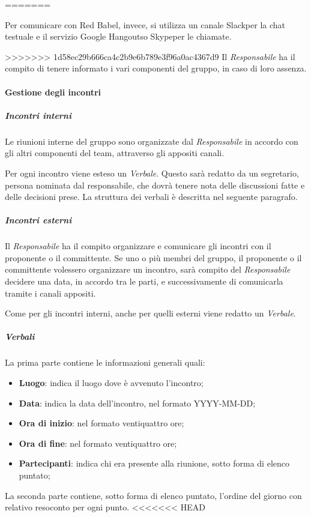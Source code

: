 =======

   					Per comunicare con Red Babel, invece, si utilizza un canale Slack\glo per la chat testuale e il servizio Google Hangouts\glos o Skype\glo per le chiamate.

>>>>>>> 1d58ec29b666ca4c2b9e6b789e3f96a0ac4367d9
   					Il \textit{Responsabile} ha il compito di tenere informato i vari componenti del gruppo, in caso di loro assenza.
   			\paragraph{Gestione degli incontri}
   				\subparagraph{Incontri interni}
   					Le riunioni interne del gruppo sono organizzate dal \textit{Responsabile} in accordo con gli altri componenti del team, attraverso gli appositi canali.

   					Per ogni incontro viene esteso un \textit{Verbale}. Questo sarà redatto da un segretario, persona nominata dal responsabile, che dovrà tenere nota delle discussioni fatte e delle decisioni prese. La struttura dei verbali è descritta nel seguente paragrafo.
	   			\subparagraph{Incontri esterni}
   					Il \textit{Responsabile} ha il compito organizzare e comunicare gli incontri con il proponente o il committente. Se uno o più membri del gruppo, il proponente o il committente volessero organizzare un incontro, sarà compito del \textit{Responsabile} decidere una data, in accordo tra le parti, e successivamente di comunicarla tramite i canali appositi.

   					Come per gli incontri interni, anche per quelli esterni viene redatto un \textit{Verbale}.
   				\subparagraph{Verbali}
   					La prima parte contiene le informazioni generali quali:
   					\begin{itemize}
   						\item \textbf{Luogo}: indica il luogo dove è avvenuto l'incontro;
   						\item \textbf{Data}: indica la data dell'incontro, nel formato YYYY-MM-DD;
   						\item \textbf{Ora di inizio}: nel formato ventiquattro ore;
   						\item \textbf{Ora di fine}: nel formato ventiquattro ore;
   						\item \textbf{Partecipanti}: indica chi era presente alla riunione, sotto forma di elenco puntato;
   					\end{itemize}
   					La seconda parte contiene, sotto forma di elenco puntato, l'ordine del giorno con relativo resoconto per ogni punto.
<<<<<<< HEAD
   					
